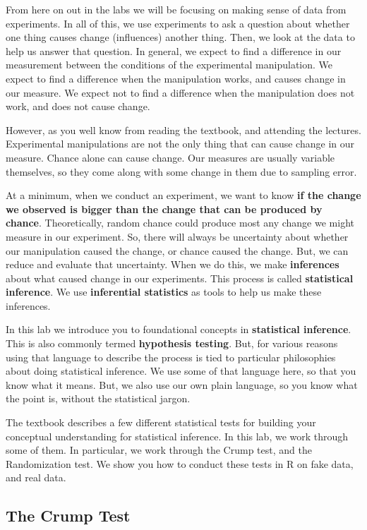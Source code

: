 \documentclass[]{book}
\theoremstyle{definition}
\theoremstyle{definition}
\theoremstyle{definition}
\theoremstyle{remark}
\begin{document}
From here on out in the labs we will be focusing on making sense of data
from experiments. In all of this, we use experiments to ask a question
about whether one thing causes change (influences) another thing. Then,
we look at the data to help us answer that question. In general, we
expect to find a difference in our measurement between the conditions of
the experimental manipulation. We expect to find a difference when the
manipulation works, and causes change in our measure. We expect not to
find a difference when the manipulation does not work, and does not
cause change.

However, as you well know from reading the textbook, and attending the
lectures. Experimental manipulations are not the only thing that can
cause change in our measure. Chance alone can cause change. Our measures
are usually variable themselves, so they come along with some change in
them due to sampling error.

At a minimum, when we conduct an experiment, we want to know \textbf{if
the change we observed is bigger than the change that can be produced by
chance}. Theoretically, random chance could produce most any change we
might measure in our experiment. So, there will always be uncertainty
about whether our manipulation caused the change, or chance caused the
change. But, we can reduce and evaluate that uncertainty. When we do
this, we make \textbf{inferences} about what caused change in our
experiments. This process is called \textbf{statistical inference}. We
use \textbf{inferential statistics} as tools to help us make these
inferences.

In this lab we introduce you to foundational concepts in
\textbf{statistical inference}. This is also commonly termed
\textbf{hypothesis testing}. But, for various reasons using that
language to describe the process is tied to particular philosophies
about doing statistical inference. We use some of that language here, so
that you know what it means. But, we also use our own plain language, so
you know what the point is, without the statistical jargon.

The textbook describes a few different statistical tests for building
your conceptual understanding for statistical inference. In this lab, we
work through some of them. In particular, we work through the Crump
test, and the Randomization test. We show you how to conduct these tests
in R on fake data, and real data.

\subsection{The Crump Test}\label{the-crump-test}
\end{document}
